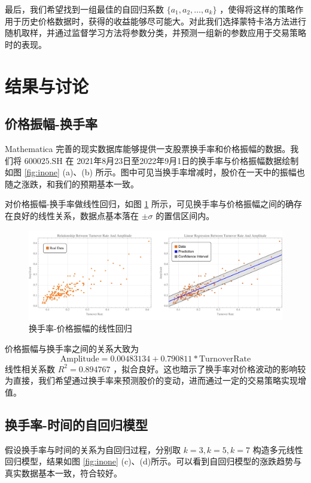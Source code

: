 \documentclass{ctexart}
\newcommand{\0}{\boldsymbol{0}}
\begin{document}
最后，我们希望找到一组最佳的自回归系数 $\{a_1,a_2,\dots,a_k\}$ ，使得将这样的策略作用于历史价格数据时，获得的收益能够尽可能大。对此我们选择蒙特卡洛方法进行随机取样，并通过监督学习方法将参数分类，并预测一组新的参数应用于交易策略时的表现。

\section{结果与讨论}

\subsection{价格振幅-换手率}

Mathematica 完善的现实数据库能够提供一支股票换手率和价格振幅的数据。我们将 $600025.\text{SH}$ 在 2021年8月23日至2022年9月1日的换手率与价格振幅数据绘制如图 \ref*{fig:inone} (a)、(b) 所示。图中可见当换手率增减时，股价在一天中的振幅也随之涨跌，和我们的预期基本一致。

对价格振幅-换手率做线性回归，如图 \ref*{fig:turnamp} 所示，可见换手率与价格振幅之间的确存在良好的线性关系，数据点基本落在 $\pm \sigma $ 的置信区间内。


\begin{figure}[ht]
    \centering
    \includegraphics[width=1\textwidth]{linearregression.jpeg}
    \caption{\kaishu 换手率-价格振幅的线性回归}
    \label{fig:turnamp}
\end{figure}

价格振幅与换手率之间的关系大致为
\[
    \text{Amplitude} = 0.00483134 + 0.790811* \text{TurnoverRate}
\]
线性相关系数 $R^2 = 0.894767$ ，拟合良好。这也暗示了换手率对价格波动的影响较为直接，我们希望通过换手率来预测股价的变动，进而通过一定的交易策略实现增值。

\subsection{换手率-时间的自回归模型}

假设换手率与时间的关系为自回归过程，分别取 $k = 3,k = 5,k = 7$ 构造多元线性回归模型，结果如图 \ref*{fig:inone} (c)、(d)所示。可以看到自回归模型的涨跌趋势与真实数据基本一致，符合较好。
\end{document}
